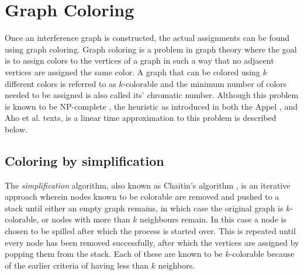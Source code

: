 \documentclass{article}
\begin{document}








\section{Graph Coloring}
Once an interference graph is constructed, the actual assignments can be found using graph coloring.
Graph coloring is a problem in graph theory where the goal is to assign colors to the vertices of a graph in such a way that no adjacent vertices are assigned the same color.
A graph that can be colored using \(k\) different colors is referred to as \(k\)-colorable and the minimum number of colors needed to be assigned is also called its' chromatic number.
Although this problem is known to be NP-complete  \cites[229]{tiger}[510]{dragon}, the heuristic as introduced in
both the Appel \cite[229]{tiger}, and Aho et al. \cites[557]{dragon} texts,
is a linear time approximation to this problem is described below.

\subsection{Coloring by simplification}

The \textit{simplification} algorithm, also known as Chaitin's algorithm \cite{chaitin}, 
 is an iterative approach wherein nodes known to be colorable are removed and pushed to a stack until either an empty graph remains, in which case the original graph is \(k\)-colorable,  or nodes with more than \(k\) neighbours remain.
In this case a node is chosen to be spilled after which the process is started over. This is repeated until every node has been removed successfully, after which the vertices are assigned by popping them from the stack. Each of these are known to be \(k\)-colorable because of the earlier criteria of having less than \(k\) neighbors.
\end{document}

